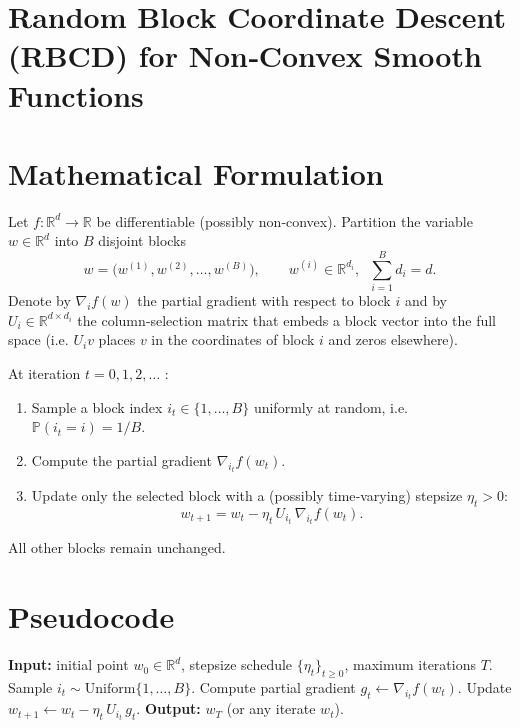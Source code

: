 \documentclass{article}
\begin{document}
\section*{Random Block Coordinate Descent (RBCD) for Non‑Convex Smooth Functions}

\section*{Mathematical Formulation}
Let $f:\mathbb{R}^{d}\rightarrow\mathbb{R}$ be differentiable (possibly non‑convex).  
Partition the variable $w\in\mathbb{R}^{d}$ into $B$ disjoint blocks
\[
w = \big( w^{(1)},w^{(2)},\dots ,w^{(B)} \big),\qquad 
w^{(i)}\in\mathbb{R}^{d_i},\;\; \sum_{i=1}^{B}d_i = d .
\]
Denote by $\nabla_i f(w)$ the partial gradient with respect to block $i$
and by $U_i\in\mathbb{R}^{d\times d_i}$ the column‑selection matrix that
embeds a block vector into the full space (i.e. $U_i v$ places $v$ in the
coordinates of block $i$ and zeros elsewhere).

At iteration $t=0,1,2,\dots$ :

\begin{enumerate}
\item Sample a block index $i_t\in\{1,\dots ,B\}$ uniformly at random,
      i.e. $\mathbb{P}(i_t=i)=1/B$.
\item Compute the partial gradient $\nabla_{i_t} f(w_t)$.
\item Update only the selected block with a (possibly time‑varying) stepsize
      $\eta_t>0$:
\[
w_{t+1}= w_t - \eta_t\, U_{i_t}\,\nabla_{i_t} f(w_t).
\tag{1}
\]
\end{enumerate}
All other blocks remain unchanged.

\section*{Pseudocode}
\begin{algorithm}[H]
\caption{Random Block Coordinate Descent (RBCD)}
\begin{algorithmic}[1]
\State \textbf{Input:} initial point $w_0\in\mathbb{R}^d$, stepsize schedule
$\{\eta_t\}_{t\ge 0}$, maximum iterations $T$.
    \State Sample $i_t\sim\text{Uniform}\{1,\dots ,B\}$.
    \State Compute partial gradient $g_t \gets \nabla_{i_t}f(w_t)$.
    \State Update $w_{t+1}\gets w_t - \eta_t\,U_{i_t}\,g_t$.
\EndFor
\State \textbf{Output:} $w_T$ (or any iterate $w_t$).
\end{algorithmic}
\end{algorithm}
\end{document}
